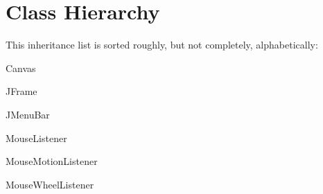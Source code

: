 \section{Class Hierarchy}
This inheritance list is sorted roughly, but not completely, alphabetically\+:\begin{DoxyCompactList}
\item Canvas\begin{DoxyCompactList}
\item {}
\end{DoxyCompactList}
\item J\+Frame\begin{DoxyCompactList}
\item {}
\end{DoxyCompactList}
\item J\+Menu\+Bar\begin{DoxyCompactList}
\item {}
\end{DoxyCompactList}
\item Mouse\+Listener\begin{DoxyCompactList}
\item {}
\end{DoxyCompactList}
\item Mouse\+Motion\+Listener\begin{DoxyCompactList}
\item {}
\end{DoxyCompactList}
\item Mouse\+Wheel\+Listener\begin{DoxyCompactList}
\item {}
\end{DoxyCompactList}
\item {}
\begin{DoxyCompactList}
\item {}
\item {}
\item {}
\end{DoxyCompactList}
\end{DoxyCompactList}
